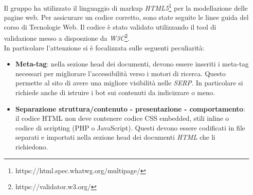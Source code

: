 Il gruppo ha utilizzato il linguaggio di markup \textit{HTML5}\footnote{https://html.spec.whatwg.org/multipage/} per la modellazione delle pagine web.
Per assicurare un codice corretto, sono state seguite le linee guida del corso di Tecnologie Web. Il codice è stato validato utilizzando il tool di validazione messo a disposzione da \textit{W3C}\footnote{https://validator.w3.org/}.\\
In particolare l'attenzione si è focalizzata sulle seguenti peculiarità:
\begin{itemize}
    \item \textbf{Meta-tag}: nella sezione head dei documenti, devono essere inseriti i meta-tag necessari per migliorare l'accessibilità verso i motori di ricerca. Questo permette al sito di avere una migliore visibilità nelle \textit{SERP}. In particolare si richiede anche di istruire i bot sui contenuti da indicizzare o meno.
    \item \textbf{Separazione struttura/contenuto - presentazione - comportamento}: il codice HTML non deve contenere codice CSS embedded, stili inline o codice di scripting (PHP o JavaScript). Questi devono essere codificati in file separati e importati nella sezione head dei documenti \textit{HTML} che li richiedono.
\end{itemize}

